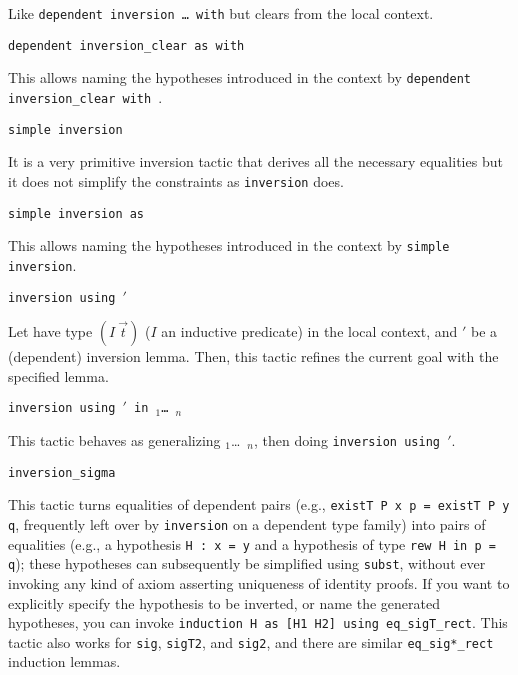 \begin{coq_example*}
\begin{Variants}
  Like \texttt{dependent inversion \dots\ with} but clears {\ident} from
  the local context.

\item {}
  \texttt{dependent inversion\_clear {\ident} as
  {\intropattern} with \term}

  This allows naming the hypotheses introduced in the context by
  \texttt{dependent inversion\_clear {\ident} with \term}.

\item {} \texttt{simple inversion \ident}

  It is a very primitive inversion tactic that derives all the necessary
  equalities  but it does not simplify the  constraints as
  \texttt{inversion} does.

\item {} \texttt{simple inversion
  {\ident} as \intropattern}

  This allows naming the hypotheses introduced in the context by
  \texttt{simple inversion}.

\item {} \texttt{inversion {\ident}
  using \ident$'$}

  Let {\ident} have type $(I~\vec{t})$ ($I$ an inductive
  predicate) in the local context, and \ident$'$ be a (dependent) inversion
  lemma. Then, this tactic refines the current goal with the specified
  lemma.

\item {} \texttt{inversion
  {\ident} using \ident$'$ in \ident$_1$\dots\ \ident$_n$}

  This tactic behaves as generalizing \ident$_1$\dots\ \ident$_n$,
  then doing \texttt{inversion {\ident} using \ident$'$}.

\item {} \texttt{inversion\_sigma}

  This tactic turns equalities of dependent pairs (e.g.,
  \texttt{existT P x p = existT P y q}, frequently left over by
  \texttt{inversion} on a dependent type family) into pairs of
  equalities (e.g., a hypothesis \texttt{H : x = y} and a hypothesis
  of type \texttt{rew H in p = q}); these hypotheses can subsequently
  be simplified using \texttt{subst}, without ever invoking any kind
  of axiom asserting uniqueness of identity proofs.  If you want to
  explicitly specify the hypothesis to be inverted, or name the
  generated hypotheses, you can invoke \texttt{induction H as [H1 H2]
    using eq\_sigT\_rect}.  This tactic also works for \texttt{sig},
  \texttt{sigT2}, and \texttt{sig2}, and there are similar
  \texttt{eq\_sig\emph{*}\_rect} induction lemmas.


\end{Variants}
\end{coq_example*}
